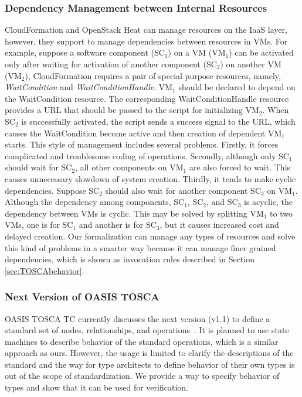 \documentclass[12pt]{report}
\begin{document}
\subsubsection{Dependency Management between Internal Resources}
CloudFormation and OpenStack Heat can manage resources on the IaaS
layer, however, they support to manage dependencies between resources
in VMs. For example, suppose a software component (SC$_1$) on a
VM (VM$_1$) can be activated only after waiting for activation of
another component (SC$_2$) on another VM (VM$_2$), CloudFormation
requires a pair of special purpose resources, namely, {\it
  WaitCondition} and {\it WaitConditionHandle}. VM$_1$ should be
declared to depend on the WaitCondition resource. The corresponding
WaitConditionHandle resource provides a URL that should be passed to
the script for initializing VM$_2$. When SC$_2$ is successfully
activated, the script sends a success signal to the URL, which causes
the WaitCondition become active and then creation of dependent VM$_1$
starts. This style of management includes several problems. Firstly,
it forces complicated and troublesome coding of operations.  Secondly,
although only SC$_1$ should wait for SC$_2$, all other components on
VM$_1$ are also forced to wait. This causes unnecessary slowdown of
system creation. Thirdly, it tends to make cyclic
dependencies. Suppose SC$_2$ should also wait for another component
SC$_3$ on VM$_1$. Although the dependency among components, SC$_1$,
SC$_2$, and SC$_3$ is acyclic, the dependency between VMs is
cyclic. This may be solved by splitting VM$_1$ to two VMs, one is for
SC$_1$ and another is for SC$_3$, but it causes increased cost and
delayed creation. Our formalization can manage any types of resources
and solve this kind of problems in a smarter way because it can manage
finer grained dependencies, which is shown as invocation rules
described in Section \ref{sec:TOSCAbehavior}.

\subsubsection{Next Version of OASIS TOSCA}
OASIS TOSCA TC currently discusses the next version (v1.1) to define a
standard set of nodes, relationships, and
operations~\cite{TOSCAYAML}. It is planned to use state machines to
describe behavior of the standard operations, which is a similar
approach as ours. However, the usage is limited to clarify the
descriptions of the standard and the way for type architects to define
behavior of their own types is out of the scope of standardization. We
provide a way to specify behavior of types and show that it can be
used for verification.
\end{document}
